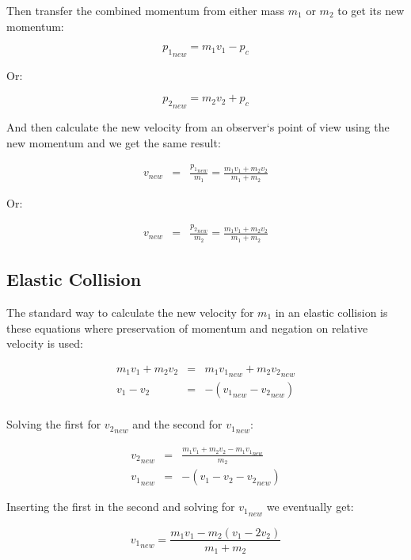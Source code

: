 \documentclass[]{../common/elementary-physics}
\begin{document}
Then transfer the combined momentum from either mass $m_1$ or $m_2$ to get its new momentum:

\begin{equation}
{p_1}_{new} = m_1 v_1 - p_c
\end{equation}

Or:

\begin{equation}
{p_2}_{new} = m_2 v_2 + p_c
\end{equation}

And then calculate the new velocity from an observer`s point of view using the new momentum and we get the same result:

\begin{eqnarray}
{v}_{new} &=& \frac{{p_1}_{new}}{m_1} = \frac{m_1 v_1 + m_2 v_2}{m_1 + m_2}
\end{eqnarray}

Or:

\begin{eqnarray}
{v}_{new} &=& \frac{{p_2}_{new}}{m_2} = \frac{m_1 v_1 + m_2 v_2}{m_1 + m_2}
\end{eqnarray}

\subsection{Elastic Collision}

The standard way to calculate the new velocity for $m_1$ in an elastic collision is these equations where preservation of momentum and negation on relative velocity is used:

\begin{eqnarray}
m_1 v_1 + m_2 v_2 &=& m_1 {v_1}_{new} + m_2 {v_2}_{new} \\
v_1 - v_2 &=& -({v_1}_{new} - {v_2}_{new}) \\
\end{eqnarray}

Solving the first for ${v_2}_{new}$ and the second for ${v_1}_{new}$:

\begin{eqnarray}
{v_2}_{new} &=& \frac{m_1 v_1 + m_2 v_2 - m_1 {v_1}_{new}}{m_2} \\
{v_1}_{new} &=& -(v_1 - v_2 - {v_2}_{new})
\end{eqnarray}

Inserting the first in the second and solving for ${v_1}_{new}$ we eventually get:

\begin{equation}
{v_1}_{new} = \frac{m_1 v_1 - m_2(v_1-2 v_2)}{m_1 + m_2}
\end{equation}
\end{document}

